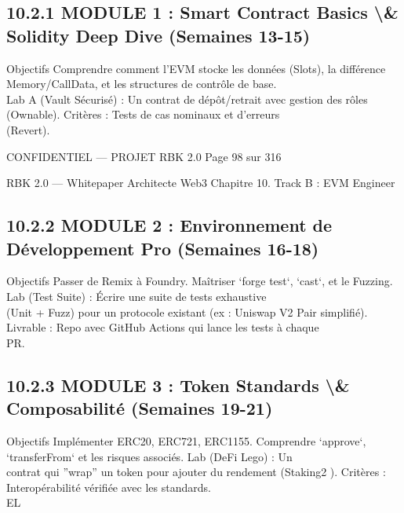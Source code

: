 \subsection{10.2.1 MODULE 1 : Smart Contract Basics \textbackslash{}& Solidity Deep Dive (Semaines 13-15)}
Objectifs Comprendre comment l’EVM stocke les données (Slots), la différence Memory/CallData, et les structures de contrôle de base.\\
Lab A (Vault Sécurisé) : Un contrat de dépôt/retrait avec gestion des rôles (Ownable). Critères : Tests de cas nominaux et d’erreurs\\
(Revert).\\
\vspace{0.5em}
\vspace{0.5em}
\vspace{0.5em}
\vspace{0.5em}
\begin{confidential}CONFIDENTIEL — PROJET RBK 2.0                                Page 98 sur 316\end{confidential}
RBK 2.0 — Whitepaper Architecte Web3                                                                                      Chapitre 10. Track B : EVM Engineer\\
\vspace{0.5em}
\vspace{0.5em}
\subsection{10.2.2 MODULE 2 : Environnement de Développement Pro (Semaines 16-18)}
\vspace{0.5em}
Objectifs Passer de Remix à Foundry. Maîtriser ‘forge test‘, ‘cast‘, et le Fuzzing. Lab (Test Suite) : Écrire une suite de tests exhaustive\\
(Unit + Fuzz) pour un protocole existant (ex : Uniswap V2 Pair simplifié). Livrable : Repo avec GitHub Actions qui lance les tests à chaque\\
PR.\\
\vspace{0.5em}
\vspace{0.5em}
\subsection{10.2.3 MODULE 3 : Token Standards \textbackslash{}& Composabilité (Semaines 19-21)}
Objectifs Implémenter ERC20, ERC721, ERC1155. Comprendre ‘approve‘, ‘transferFrom‘ et les risques associés. Lab (DeFi Lego) : Un\\
contrat qui ”wrap” un token pour ajouter du rendement (Staking2 ). Critères : Interopérabilité vérifiée avec les standards.\\
\vspace{0.5em}
\vspace{0.5em}
\vspace{0.5em}
\vspace{0.5em}
EL\\
